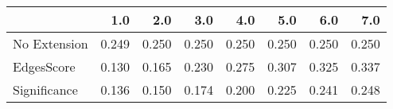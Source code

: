 \begin{tabular}{lrrrrrrr}
\toprule
{} &   1.0 &   2.0 &   3.0 &   4.0 &   5.0 &   6.0 &   7.0 \\
\midrule
No Extension & 0.249 & 0.250 & 0.250 & 0.250 & 0.250 & 0.250 & 0.250 \\
EdgesScore   & 0.130 & 0.165 & 0.230 & 0.275 & 0.307 & 0.325 & 0.337 \\
Significance & 0.136 & 0.150 & 0.174 & 0.200 & 0.225 & 0.241 & 0.248 \\
\bottomrule
\end{tabular}
